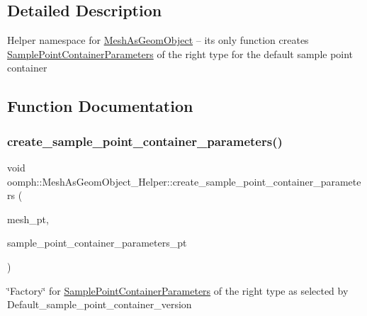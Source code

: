 \subsection{Detailed Description}
Helper namespace for \hyperlink{classoomph_1_1MeshAsGeomObject}{Mesh\+As\+Geom\+Object} -- its only function creates \hyperlink{classoomph_1_1SamplePointContainerParameters}{Sample\+Point\+Container\+Parameters} of the right type for the default sample point container 

\subsection{Function Documentation}
\mbox{\label{namespaceoomph_1_1MeshAsGeomObject__Helper_a4c01eba9e65a9757c7e18ff56cb28122}} 
\subsubsection{\texorpdfstring{create\+\_\+sample\+\_\+point\+\_\+container\+\_\+parameters()}{create\_sample\_point\_container\_parameters()}}
{\footnotesize\ttfamily void oomph\+::\+Mesh\+As\+Geom\+Object\+\_\+\+Helper\+::create\+\_\+sample\+\_\+point\+\_\+container\+\_\+parameters (\begin{DoxyParamCaption}\item[{\hyperlink{classoomph_1_1Mesh}{Mesh} $\ast$}]{mesh\+\_\+pt,  }\item[{\hyperlink{classoomph_1_1SamplePointContainerParameters}{Sample\+Point\+Container\+Parameters} $\ast$\&}]{sample\+\_\+point\+\_\+container\+\_\+parameters\+\_\+pt }\end{DoxyParamCaption})}



\char`\"{}\+Factory\char`\"{} for \hyperlink{classoomph_1_1SamplePointContainerParameters}{Sample\+Point\+Container\+Parameters} of the right type as selected by Default\+\_\+sample\+\_\+point\+\_\+container\+\_\+version 



